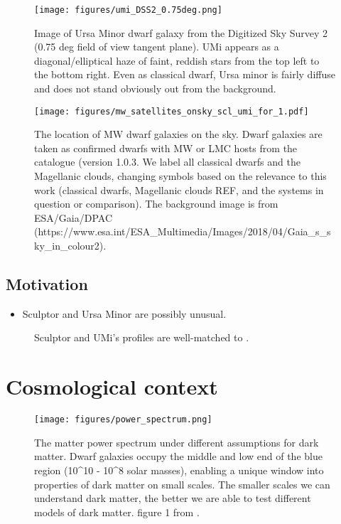 \begin{figure}
\centering
\texttt{[image: figures/umi\_DSS2\_0.75deg.png]}
\caption[Picture of Ursa Minor]{Image of Ursa Minor dwarf galaxy from
the Digitized Sky Survey 2 (0.75 deg field of view tangent plane). UMi
appears as a diagonal/elliptical haze of faint, reddish stars from the
top left to the bottom right. Even as classical dwarf, Ursa minor is
fairly diffuse and does not stand obviously out from the
background.}\label{fig:umi_image}
\end{figure}

\begin{figure}
\centering
\texttt{[image: figures/mw\_satellites\_onsky\_scl\_umi\_for\_1.pdf]}
\caption[Dwarf galaxies sky position]{The location of MW dwarf galaxies
on the sky. Dwarf galaxies are taken as confirmed dwarfs with MW or LMC
hosts from the \citet{pace2024} catalogue (version 1.0.3. We label all
classical dwarfs and the Magellanic clouds, changing symbols based on
the relevance to this work (classical dwarfs, Magellanic clouds REF, and
the systems in question or comparison). The background image is from
ESA/Gaia/DPAC
(https://www.esa.int/ESA\_Multimedia/Images/2018/04/Gaia\_s\_sky\_in\_colour2).}\label{fig:mw_satellite_system}
\end{figure}

\subsection{Motivation}\label{motivation}

\begin{itemize}
\tightlist
\item
  Sculptor and Ursa Minor are possibly unusual.
\end{itemize}

\begin{figure}
\centering
{}
\caption[Idealized simulations match Scl and UMi]{Sculptor and UMi's
profiles are well-matched to \citet{PNM2008}.}\label{fig:toy_profiles}
\end{figure}

\section{Cosmological context}\label{cosmological-context}

\begin{figure}
\centering
\texttt{[image: figures/power\_spectrum.png]}
\caption[Cosmological Power Spectrum]{The matter power spectrum under
different assumptions for dark matter. Dwarf galaxies occupy the middle
and low end of the blue region (10\^{}10 - 10\^{}8 solar masses),
enabling a unique window into properties of dark matter on small scales.
The smaller scales we can understand dark matter, the better we are able
to test different models of dark matter. figure 1 from
\citet{bechtol+2022}.}\label{fig:cosmological_power_spectrum}
\end{figure}

